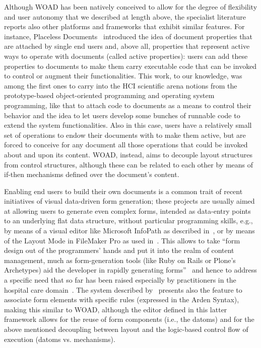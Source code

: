 \documentclass{article}
\begin{document}
Although WOAD has been natively conceived to allow for the degree of flexibility and user autonomy that we described at length above, the specialist literature reports also other platforms and frameworks that exhibit similar features. For instance, Placeless Documents~\citep{dourish_extending_2000} introduced the idea of document properties that are attached by single end users and, above all, properties that represent active ways to operate with documents (called active properties): users can add these properties to documents to make them carry executable code that can be invoked to control or augment their functionalities. This work, to our knowledge, was among the first ones to carry into the HCI scientific arena notions from the prototype-based object-oriented programming and operating system programming, like that to attach code to documents as a means to control their behavior and the idea to let users develop some bunches of runnable code to extend the system functionalities. Also in this case, users have a relatively small set of operations to endow their documents with to make them active, but are forced to conceive for any document all those operations that could be invoked about and upon its content. WOAD, instead, aims to decouple layout structures from control structures, although these can be related to each other by means of if-then mechanisms defined over the document's content. 

Enabling end users to build their own documents is a common trait of recent initiatives of visual data-driven form generation; these projects are usually aimed at allowing users to generate even complex forms, intended as data-entry points to an underlying flat data structure, without particular programming skills, e.g., by means of a visual editor like Microsoft\textsuperscript{\textregistered} InfoPath\textsuperscript{\textregistered} as described in~\citep{mamlin_cooking_2006}, or by means of the Layout Mode in FileMaker Pro\textsuperscript{\textregistered} as used in~\citep{chen_developing_2011}. This allows to take ``form design out of the programmers' hands and put it into the realm of content management, much as form-generation tools (like Ruby on Rails or Plone's Archetypes) aid the developer in rapidly generating forms''~\citep{mamlin_cooking_2006} and hence to address a specific need that so far has been raised especially by practitioners in the hospital care domain~\citep[e.g.,][]{mamlin_cooking_2006,morrison_observing_2009,chen_developing_2011,cabitza_woad_2011}. The system described by~\citet{mamlin_cooking_2006} presents also the feature to associate form elements with specific rules (expressed in the Arden Syntax), making this similar to WOAD, although the editor defined in this latter framework allows for the reuse of form components (i.e., the datoms) and for the above mentioned decoupling between layout and the logic-based control flow of execution (datoms vs. mechanisms). 
\end{document}
